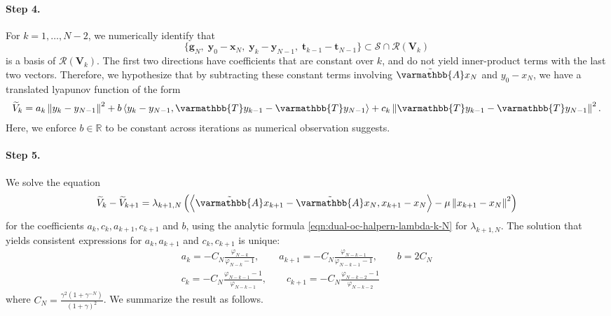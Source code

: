 \documentclass{article}
\theoremstyle{definition}
\theoremstyle{plain}
\newcommand{\vg}{{\mathbf{g}}}
\newcommand{\vt}{{\mathbf{t}}}
\newcommand{\vx}{{\mathbf{x}}}
\newcommand{\vy}{{\mathbf{y}}}
\newcommand{\vV}{{\mathbf{V}}}
\newcommand{\cR}{{\mathcal{R}}}
\newcommand{\cS}{{\mathcal{S}}}
\newcommand{\reals}{\mathbb{R}}
\newcommand{\opA}{{\varmathbb{A}}}
\newcommand{\opT}{{\varmathbb{T}}}
\newcommand{\inprod}[2]{\left\langle #1,#2 \right\rangle}
\newcommand{\sqnorm}[1]{\left\| #1 \right\|^2}
\newcommand{\topa}{\tilde{\opA}}
\begin{document}
\paragraph{Step 4.}
For $k=1,\dots,N-2$, we numerically identify that
\[
    \{\vg_N,\; \vy_0-\vx_N,\; \vy_k-\vy_{N-1},\; \vt_{k-1}-\vt_{N-1}\}
    \subset \cS\cap\cR(\vV_k)
\]
is a basis of $\cR(\vV_k)$.
The first two directions have coefficients that are constant over \(k\), and do not yield inner-product terms with the last two vectors.
Therefore, we hypothesize that by subtracting these constant terms involving $\topa x_N$ and $y_0 - x_N$, we have a translated lyapunov function of the form
\begin{align*}
    \widetilde{V}_k = a_k \sqnorm{y_k - y_{N-1}} + b \inprod{y_k - y_{N-1}}{\opT y_{k-1} - \opT y_{N-1}} + c_k \sqnorm{\opT y_{k-1} - \opT y_{N-1}} .
\end{align*}
Here, we enforce $b\in \reals$ to be constant across iterations as numerical observation suggests.


\paragraph{Step 5.}
We solve the equation
\begin{align}
\label{eqn:dual-oc-halpern-difference}
    \widetilde V_k-\widetilde V_{k+1}
    =
    \lambda_{k+1,N}
    \left(
    \inprod{\topa x_{k+1}-\topa x_N}{x_{k+1}-x_N}
    -\mu\sqnorm{x_{k+1}-x_N}
    \right)
\end{align}
for the coefficients $a_k, c_k, a_{k+1}, c_{k+1}$ and $b$, using the analytic formula \eqref{eqn:dual-oc-halpern-lambda-k-N} for $\lambda_{k+1,N}$.
The solution that yields consistent expressions for $a_k, a_{k+1}$ and $c_k, c_{k+1}$ is unique:
\begin{gather*}
    a_k = -C_N \frac{\varphi_{N-k}}{\varphi_{N-k}-1} , \qquad a_{k+1} = -C_N \frac{\varphi_{N-k-1}}{\varphi_{N-k-1}-1} , \qquad b = 2C_N \\
    c_k = -C_N \frac{\varphi_{N-k-1}-1}{\varphi_{N-k-1}} , \qquad c_{k+1} = -C_N \frac{\varphi_{N-k-2}-1}{\varphi_{N-k-2}}
\end{gather*}
where $C_N=\frac{\gamma^2(1+\gamma^{-N})}{(1+\gamma)^2}$.
We summarize the result as follows.
\end{document}
